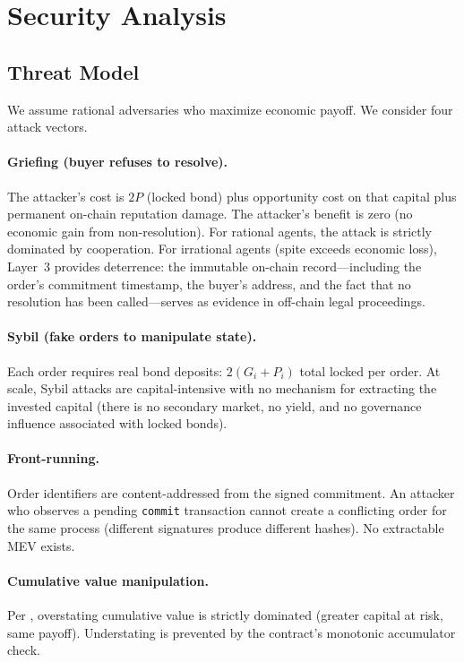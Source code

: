 \documentclass[11pt,a4paper]{article}
\theoremstyle{definition}
\theoremstyle{remark}
\newcommand{\pay}{P}           %
\newcommand{\cumval}{G}        %
\begin{document}
\section{Security Analysis}
\label{sec:security}

\subsection{Threat Model}

We assume rational adversaries who maximize economic payoff. We consider
four attack vectors.

\paragraph{Griefing (buyer refuses to resolve).}
The attacker's cost is $2\pay$ (locked bond) plus opportunity cost on
that capital plus permanent on-chain reputation damage. The attacker's
benefit is zero (no economic gain from non-resolution). For rational
agents, the attack is strictly dominated by cooperation. For irrational
agents (spite exceeds economic loss), Layer~3 provides deterrence: the
immutable on-chain record---including the order's commitment timestamp,
the buyer's address, and the fact that no resolution has been
called---serves as evidence in off-chain legal proceedings.

\paragraph{Sybil (fake orders to manipulate state).}
Each order requires real bond deposits:
$2(\cumval_i + \pay_i)$ total locked per order. At scale, Sybil attacks
are capital-intensive with no mechanism for extracting the invested
capital (there is no secondary market, no yield, and no governance
influence associated with locked bonds).

\paragraph{Front-running.}
Order identifiers are content-addressed from the signed commitment. An
attacker who observes a pending \texttt{commit} transaction cannot
create a conflicting order for the same process (different signatures
produce different hashes). No extractable MEV exists.

\paragraph{Cumulative value manipulation.}
Per , overstating cumulative value is
strictly dominated (greater capital at risk, same payoff). Understating
is prevented by the contract's monotonic accumulator check.
\end{document}
